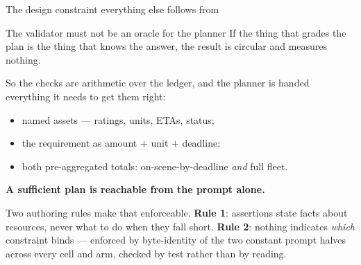 \documentclass[aspectratio=169,11pt]{beamer}
\begin{document}
\begin{frame}{The design constraint everything else follows from}

\begin{block}{The validator must not be an oracle for the planner}
If the thing that grades the plan is the thing that knows the answer, the result is
circular and measures nothing.
\end{block}

So the checks are arithmetic over the ledger, and the planner is handed everything it
needs to get them right:

\begin{itemize}
  \item named assets --- ratings, units, ETAs, status;
  \item the requirement as amount $+$ unit $+$ deadline;
  \item both pre-aggregated totals: on-scene-by-deadline \emph{and} full fleet.
\end{itemize}

\begin{center}
\textbf{A sufficient plan is reachable from the prompt alone.}
\end{center}

\vfill
{\footnotesize\textcolor{inkfaint}{Two authoring rules make that enforceable.
\textbf{Rule 1}: assertions state facts about resources, never what to do when they fall
short. \textbf{Rule 2}: nothing indicates \emph{which} constraint binds --- enforced by
byte-identity of the two constant prompt halves across every cell and arm, checked by
test rather than by reading.}}

\end{frame}

\end{document}
